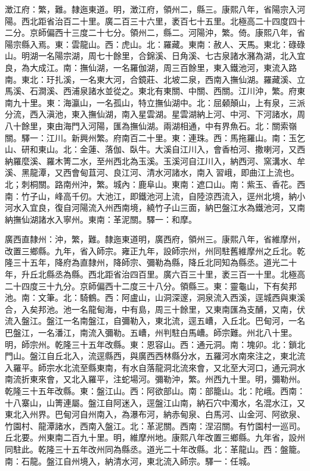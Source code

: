 \begin{pinyinscope}
澂江府：繁，難。隸迤東道。明，澂江府，領州二，縣三。康熙八年，省陽宗入河陽。西北距省治百二十里。廣二百三十六里，袤百七十五里。北極高二十四度四十二分。京師偏西十三度二十七分。領州二，縣二。河陽沖，繁。倚。康熙八年，省陽宗縣入焉。東：雲龍山。西：虎山。北：羅藏。東南：赦人、天馬。東北：碌碌山。明湖一名陽宗湖，周七十餘里，合錦溪、日角溪、七古泉諸水瀦為湖，北入宜良，為大成江。南：撫仙湖，一名羅伽湖，周三百餘里，東入鐵池河，東流入路南。東北：玗扎溪，一名東大河，合鏡莊、北坡二泉，西南入撫仙湖。羅藏溪、立馬溪、石澗溪、西浦泉諸水並從之。東北有東關、中關、西關。江川沖，繁。府東南九十里。東：海瀛山，一名孤山，特立撫仙湖中。北：屈顙顛山，上有泉，三派分流，西入滇池，東入撫仙湖，南入星雲湖。星雲湖納上河、中河、下河諸水，周八十餘里，東由海門入河陽，匯為撫仙湖。兩湖相通，中有界魚石。北：關索嶺關。驛一：江川。新興州繁。府南百二十里。東：連珠。西：馬拖羅山。南：玉乞山、研和東山。北：金蓮、落伽、臥牛。大溪自江川入，會香柏河、撒喇河，又西納羅麼溪、羅木箐二水，至州西北為玉溪。玉溪河自江川入，納西河、窯溝水、牟溪、黑龍潭，又西會甸苴河、良江河、清水河諸水，南入習峨，即曲江上流也。北；刺桐關。路南州沖，繁。城內：鹿阜山。東南：遮口山。南：紫玉、香花。西南：竹子山，峰高千仞。大池江，即鐵池河上流，自陸涼西流入，逕州北境，納小河水入宜良，復自河陽流入州西南境，繞竹子山三面，納巴盤江水為鐵池河，又南納撫仙湖諸水入寧州。東南：革泥關。驛一：和摩。

廣西直隸州：沖，繁，難。隸迤東道明，廣西府，領州三。康熙八年，省維摩州，改置三鄉縣。九年，省入師宗。雍正九年，設師宗州，州同駐舊維摩州之丘北。乾隆三十五年，降府為直隸州，降師宗、彌勒為縣，降丘北同知為縣丞。道光二十年，升丘北縣丞為縣。西北距省治四百里。廣六百三十里，袤三百一十里。北極高二十四度三十九分。京師偏西十二度三十八分。領縣三。東：靈龜山，下有矣邦池。南：文筆。北：騎鶴。西：阿盧山，山洞深邃，洞泉流入西溪，逕城西與東溪合，入矣邦池。池一名龍甸海，中有島，周三十餘里，又東南匯為支酺，又南，伏流入盤江。盤江一名南盤江，自彌勒入，東北流，逕五嶆，入丘北。巴甸河，一名巴盤江，一名潘江，南流入彌勒。五嶆，州判駐白馬嶆。師宗難。州北八十里。明，師宗州。乾隆三十五年改縣。東：恩容山。西：通元洞。南：塊卯。北：鎖北門山。盤江自丘北入，流逕縣西，與廣西西林縣分水，五羅河水南來注之，東北流入羅平。師宗水北流至縣東南，有水自落龍洞北流來會，又北至大河口，通元洞水南流折東來會，又北入羅平，注蛇場河。彌勒沖，繁。州西九十里。明，彌勒州。乾隆三十五年改縣。東：盤江山。西：阿欲部山。南：部籠山。北：陀峨。西南：十八寨山，山箐連屬。盤江自阿迷入，逕盤江山南，納石穴中濁水，名混水江，又東北入州界。巴甸河自州南入，為瀑布河，納赤甸泉、白馬河、山金河、阿欲泉、竹園村、龍潭諸水，西南入盤江。北：革泥關。西南：涅沼關。有竹園村一巡司。丘北要。州東南二百九十里。明，維摩州地。康熙八年改置三鄉縣。九年省，設州同駐此。乾隆三十五年改州同為縣丞。道光二十年改縣。北：革龍山。西：盤籠。南：石龍。盤江自州境入，納清水河，東北流入師宗。驛一：任城。


\end{pinyinscope}

